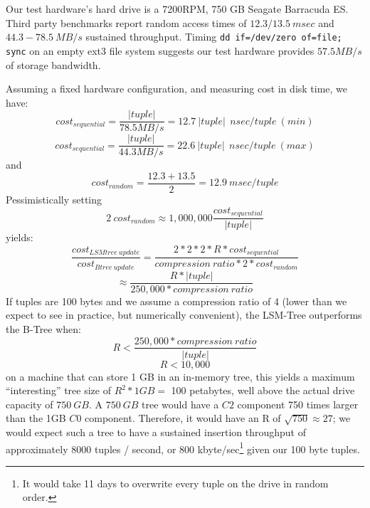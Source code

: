 \documentclass{sig-alternate-sigmod08}
\begin{document}
Our test hardware's hard drive is a 7200RPM, 750 GB Seagate Barracuda
ES.  
Third party
benchmarks\cite{hdBench} %
report random access times of $12.3/13.5~msec$ and $44.3-78.5~MB/s$
sustained throughput.  Timing {\tt dd if=/dev/zero of=file; sync} on an
empty ext3 file system suggests our test hardware provides $57.5MB/s$ of
storage bandwidth.


Assuming a fixed hardware configuration, and measuring cost in disk
time, we have:
\[
   cost_{sequential}=\frac{|tuple|}{78.5MB/s}=12.7~|tuple|~~nsec/tuple~(min)
\]
\[
   cost_{sequential}=\frac{|tuple|}{44.3MB/s}=22.6~|tuple|~~nsec/tuple~(max)
\]
and
\[
   cost_{random}=\frac{12.3+13.5}{2} = 12.9~msec/tuple
\]
Pessimistically setting
\[
2~cost_{random}\approx1,000,000\frac{cost_{sequential}}{|tuple|}
\] yields: \[
    \frac{cost_{LSMtree~update}}{cost_{Btree~update}}=\frac{2*2*2*R*cost_{sequential}}{compression~ratio*2*cost_{random}}
\]
\[
   \approx\frac{R*|tuple|}{250,000*compression~ratio}
\]
If tuples are 100 bytes and we assume a compression ratio of 4 (lower
than we expect to see in practice, but numerically convenient), the
LSM-Tree outperforms the B-Tree when:
\[
    R < \frac{250,000*compression~ratio}{|tuple|}
\]
\[
    R < 10,000
\]
on a machine that can store 1 GB in an in-memory tree, this yields a
maximum ``interesting'' tree size of $R^2*1GB = $ 100 petabytes, well
above the actual drive capacity of $750~GB$.  A $750~GB$ tree would
have a $C2$ component 750 times larger than the 1GB $C0$ component.
Therefore, it would have an R of $\sqrt{750}\approx27$; we would
expect such a tree to have a sustained insertion throughput of
approximately 8000 tuples / second, or 800 kbyte/sec\footnote{It would
  take 11 days to overwrite every tuple on the drive in random order.}
given our 100 byte tuples.
\end{document}
